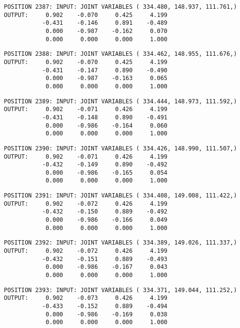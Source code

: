 \begin{verbatim}
POSITION 2387: INPUT: JOINT VARIABLES ( 334.480, 148.937, 111.761,)
OUTPUT:     0.902    -0.070     0.425     4.199
           -0.431    -0.146     0.891    -0.489
            0.000    -0.987    -0.162     0.070
            0.000     0.000     0.000     1.000
\end{verbatim} \pagebreak[1]\begin{verbatim}
POSITION 2388: INPUT: JOINT VARIABLES ( 334.462, 148.955, 111.676,)
OUTPUT:     0.902    -0.070     0.425     4.199
           -0.431    -0.147     0.890    -0.490
            0.000    -0.987    -0.163     0.065
            0.000     0.000     0.000     1.000
\end{verbatim} \pagebreak[1]\begin{verbatim}
POSITION 2389: INPUT: JOINT VARIABLES ( 334.444, 148.973, 111.592,)
OUTPUT:     0.902    -0.071     0.426     4.199
           -0.431    -0.148     0.890    -0.491
            0.000    -0.986    -0.164     0.060
            0.000     0.000     0.000     1.000
\end{verbatim} \pagebreak[1]\begin{verbatim}
POSITION 2390: INPUT: JOINT VARIABLES ( 334.426, 148.990, 111.507,)
OUTPUT:     0.902    -0.071     0.426     4.199
           -0.432    -0.149     0.890    -0.492
            0.000    -0.986    -0.165     0.054
            0.000     0.000     0.000     1.000
\end{verbatim} \pagebreak[1]\begin{verbatim}
POSITION 2391: INPUT: JOINT VARIABLES ( 334.408, 149.008, 111.422,)
OUTPUT:     0.902    -0.072     0.426     4.199
           -0.432    -0.150     0.889    -0.492
            0.000    -0.986    -0.166     0.049
            0.000     0.000     0.000     1.000
\end{verbatim} \pagebreak[1]\begin{verbatim}
POSITION 2392: INPUT: JOINT VARIABLES ( 334.389, 149.026, 111.337,)
OUTPUT:     0.902    -0.072     0.426     4.199
           -0.432    -0.151     0.889    -0.493
            0.000    -0.986    -0.167     0.043
            0.000     0.000     0.000     1.000
\end{verbatim} \pagebreak[1]\begin{verbatim}
POSITION 2393: INPUT: JOINT VARIABLES ( 334.371, 149.044, 111.252,)
OUTPUT:     0.902    -0.073     0.426     4.199
           -0.433    -0.152     0.889    -0.494
            0.000    -0.986    -0.169     0.038
            0.000     0.000     0.000     1.000
\end{verbatim} \pagebreak[1]\begin{verbatim}

\end{verbatim}
